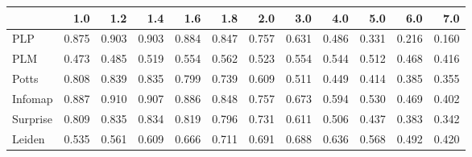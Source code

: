 \begin{tabular}{lrrrrrrrrrrr}
\toprule
{} &   1.0 &   1.2 &   1.4 &   1.6 &   1.8 &   2.0 &   3.0 &   4.0 &   5.0 &   6.0 &   7.0 \\
\midrule
PLP      & 0.875 & 0.903 & 0.903 & 0.884 & 0.847 & 0.757 & 0.631 & 0.486 & 0.331 & 0.216 & 0.160 \\
PLM      & 0.473 & 0.485 & 0.519 & 0.554 & 0.562 & 0.523 & 0.554 & 0.544 & 0.512 & 0.468 & 0.416 \\
Potts    & 0.808 & 0.839 & 0.835 & 0.799 & 0.739 & 0.609 & 0.511 & 0.449 & 0.414 & 0.385 & 0.355 \\
Infomap  & 0.887 & 0.910 & 0.907 & 0.886 & 0.848 & 0.757 & 0.673 & 0.594 & 0.530 & 0.469 & 0.402 \\
Surprise & 0.809 & 0.835 & 0.834 & 0.819 & 0.796 & 0.731 & 0.611 & 0.506 & 0.437 & 0.383 & 0.342 \\
Leiden   & 0.535 & 0.561 & 0.609 & 0.666 & 0.711 & 0.691 & 0.688 & 0.636 & 0.568 & 0.492 & 0.420 \\
\bottomrule
\end{tabular}
